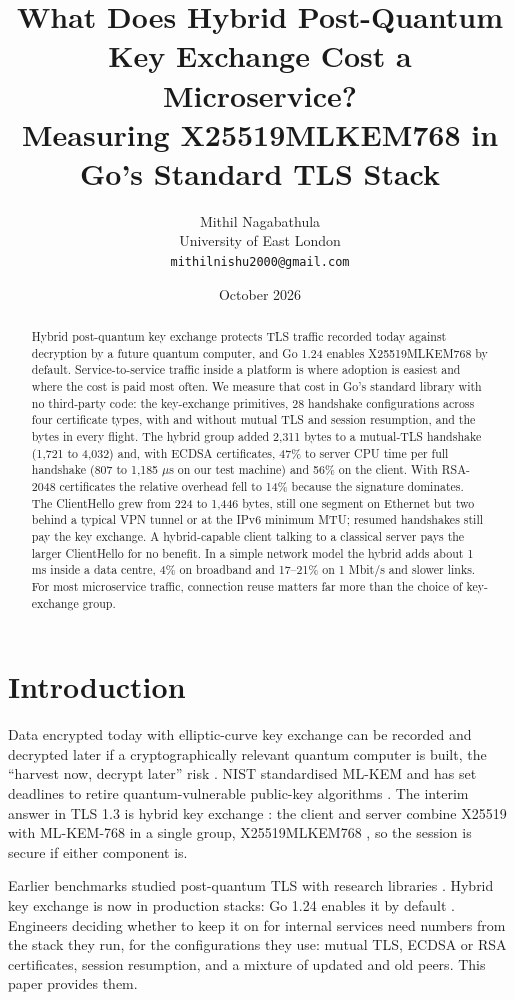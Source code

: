 \documentclass[11pt]{article}
\title{What Does Hybrid Post-Quantum Key Exchange Cost a Microservice?\\
\large Measuring X25519MLKEM768 in Go's Standard TLS Stack}
\author{Mithil Nagabathula\\University of East London\\\texttt{mithilnishu2000@gmail.com}}
\date{October 2026}
\begin{document}
\maketitle
\sloppy

\begin{abstract}
Hybrid post-quantum key exchange protects TLS traffic recorded today against decryption by a future quantum computer, and Go 1.24
enables X25519MLKEM768 by default. Service-to-service traffic inside a platform is where adoption is easiest and where the cost is
paid most often. We measure that cost in Go's standard library with no third-party code: the key-exchange primitives, 28 handshake
configurations across four certificate types, with and without mutual TLS and session resumption, and the bytes in every flight. The
hybrid group added 2{,}311 bytes to a mutual-TLS handshake (1{,}721 to 4{,}032) and, with ECDSA certificates, 47\% to server CPU time per
full handshake (807 to 1{,}185 \(\mu\)s on our test machine) and 56\% on the client. With RSA-2048 certificates the relative overhead fell
to 14\% because the signature dominates. The ClientHello grew from 224 to 1{,}446 bytes, still one segment on Ethernet but two behind a
typical VPN tunnel or at the IPv6 minimum MTU; resumed handshakes still pay the key exchange. A hybrid-capable client talking to a
classical server pays the larger ClientHello for no benefit. In a simple network model the hybrid adds about 1 ms inside a data
centre, 4\% on broadband and 17--21\% on 1 Mbit/s and slower links. For most microservice traffic, connection reuse matters far more than
the choice of key-exchange group.
\end{abstract}

\section{Introduction}
Data encrypted today with elliptic-curve key exchange can be recorded and decrypted later if a cryptographically relevant quantum
computer is built, the ``harvest now, decrypt later'' risk \cite{mosca2018}. NIST standardised ML-KEM \cite{fips203} and has set
deadlines to retire quantum-vulnerable public-key algorithms \cite{nistir8547}. The interim answer in TLS 1.3 \cite{rfc8446} is hybrid key
exchange \cite{hybriddesign}: the client and server combine X25519 with ML-KEM-768 in a single group, X25519MLKEM768 \cite{ecdhemlkem}, so
the session is secure if either component is.

Earlier benchmarks studied post-quantum TLS with research libraries \cite{paquin2020,sikeridis2020}. Hybrid key exchange is now in
production stacks: Go 1.24 enables it by default \cite{go124}. Engineers deciding whether to keep it on for internal services need
numbers from the stack they run, for the configurations they use: mutual TLS, ECDSA or RSA certificates, session resumption, and a
mixture of updated and old peers. This paper provides them.
\end{document}
